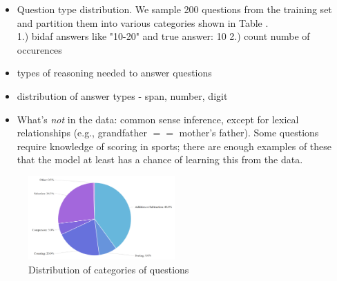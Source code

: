 \begin{itemize}
    \item Question type distribution. 
    We sample 200 questions from the training set and partition them into various categories shown in Table .\\
    1.) bidaf answers like "10-20" and true answer: 10
    2.) count numbe of occurences 
    \item types of reasoning needed to answer questions 
    \item distribution of answer types - span, number, digit
    \item What's \emph{not} in the data: common sense inference, except for lexical relationships (e.g., grandfather $==$ mother's father).  Some questions require knowledge of scoring in sports; there are enough examples of these that the model at least has a chance of learning this from the data.
\end{itemize}

\begin{figure}
    \centering
    \includegraphics[width=0.5\textwidth]{images/answer_distrib}
    \caption{Distribution of categories of questions}
    \label{fig:answer_distrib}
\end{figure}

